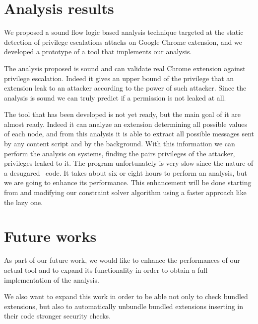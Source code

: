 \section{Analysis results}
We proposed a sound flow logic based analysis technique targeted at the static detection of privilege escalations attacks on Google Chrome extension, and we developed a prototype of a tool that implements our analysis.

The analysis proposed is sound and can validate real Chrome extension against privilege escalation. Indeed it gives an upper bound of the privilege that an extension leak to an attacker according to the power of such attacker. Since the analysis is sound we can truly predict if a permission is not leaked at all.

The tool that has been developed is not yet ready, but the main goal of it are almost ready. Indeed it can analyze an extension determining all possible values of each node, and from this analysis it is able to extract all possible messages sent by any content script and by the background. With this information we can perform the analysis on systems, finding the pairs privileges of the attacker, privileges leaked to it. The program unfortunately is very slow since the nature of a desugared \ljs\ code. It takes about six or eight hours to perform an analysis, but we are going to enhance its performance. This enhancement will be done starting from \cite{TAJS, TAJSDOM} and modifying our constraint solver algorithm using a faster approach like the lazy one.

\section{Future works}%
\label{sec:FutureWorks}
As part of our future work, we would like to enhance the performances of our actual tool and to expand its functionality in order to obtain a full implementation of the analysis.

We also want to expand this work in order to be able not only to check bundled extensions, but also to automatically unbundle bundled extensions inserting in their code stronger security checks.

